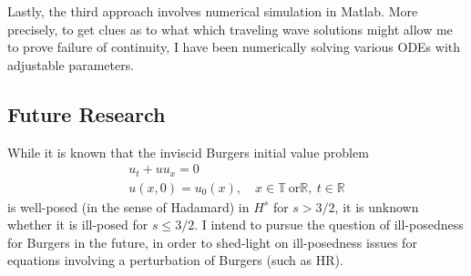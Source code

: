 \documentclass[12pt,reqno]{amsart}
\newcommand{\rr}{\mathbb{R}}
\newcommand{\ci}{\mathbb{T}}
\begin{document}
Lastly, the third approach involves numerical simulation in Matlab. More
precisely, to get clues as to what which traveling wave solutions might allow me
to prove failure of continuity, I have been numerically solving various ODEs
with adjustable parameters. 
\subsection{Future Research} 
\label{ssec:fut-research}
While it is known that the inviscid Burgers initial value problem
\begin{gather*}
    u_{t} + u u_{x} = 0
    \\
    u(x, 0) = u_{0}(x), \quad x \in \ci \ \text{or} \rr, \ t \in \rr
\end{gather*}
is well-posed (in the sense of Hadamard) in $H^{s}$ for $s > 3/2$, it is unknown
whether it is ill-posed for $s \le 3/2$. I intend to pursue the question of
ill-posedness for Burgers in the future, in order to shed-light on ill-posedness
issues for equations involving a perturbation of Burgers (such as HR).
\end{document}
